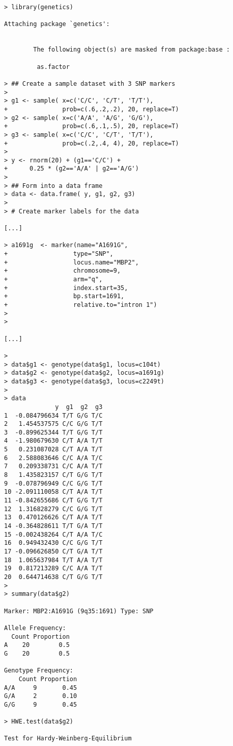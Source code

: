 \documentclass{report}
\begin{document}
{\small
\begin{verbatim}
> library(genetics)

Attaching package `genetics':


        The following object(s) are masked from package:base :

         as.factor 

> ## Create a sample dataset with 3 SNP markers
> 
> g1 <- sample( x=c('C/C', 'C/T', 'T/T'), 
+               prob=c(.6,.2,.2), 20, replace=T)
> g2 <- sample( x=c('A/A', 'A/G', 'G/G'), 
+               prob=c(.6,.1,.5), 20, replace=T)
> g3 <- sample( x=c('C/C', 'C/T', 'T/T'), 
+               prob=c(.2,.4, 4), 20, replace=T)
> 
> y <- rnorm(20) + (g1=='C/C') + 
+      0.25 * (g2=='A/A' | g2=='A/G')
> 
> ## Form into a data frame
> data <- data.frame( y, g1, g2, g3)
> 
> # Create marker labels for the data 

[...]

> a1691g  <- marker(name="A1691G",
+                  type="SNP",
+                  locus.name="MBP2",
+                  chromosome=9, 
+                  arm="q", 
+                  index.start=35,
+                  bp.start=1691,
+                  relative.to="intron 1")
> 
> 

[...]

> 
> data$g1 <- genotype(data$g1, locus=c104t)
> data$g2 <- genotype(data$g2, locus=a1691g)
> data$g3 <- genotype(data$g3, locus=c2249t)
> 
> data
              y  g1  g2  g3
1  -0.084796634 T/T G/G T/C
2   1.454537575 C/C G/G T/T
3  -0.899625344 T/T G/G T/T
4  -1.980679630 C/T A/A T/T
5   0.231087028 C/T A/A T/T
6   2.588083646 C/C A/A T/C
7   0.209338731 C/C A/A T/T
8   1.435823157 C/T G/G T/T
9  -0.078796949 C/C G/G T/T
10 -2.091110058 C/T A/A T/T
11 -0.842655686 C/T G/G T/T
12  1.316828279 C/C G/G T/T
13  0.470126626 C/T A/A T/T
14 -0.364828611 T/T G/A T/T
15 -0.002438264 C/T A/A T/C
16  0.949432430 C/C G/G T/T
17 -0.096626850 C/T G/A T/T
18  1.065637984 T/T A/A T/T
19  0.817213289 C/C A/A T/T
20  0.644714638 C/T G/G T/T
> 
> summary(data$g2)

Marker: MBP2:A1691G (9q35:1691) Type: SNP

Allele Frequency:
  Count Proportion
A    20        0.5
G    20        0.5

Genotype Frequency:
    Count Proportion
A/A     9       0.45
G/A     2       0.10
G/G     9       0.45

> HWE.test(data$g2)

Test for Hardy-Weinberg-Equilibrium


\end{verbatim}}
\end{document}
